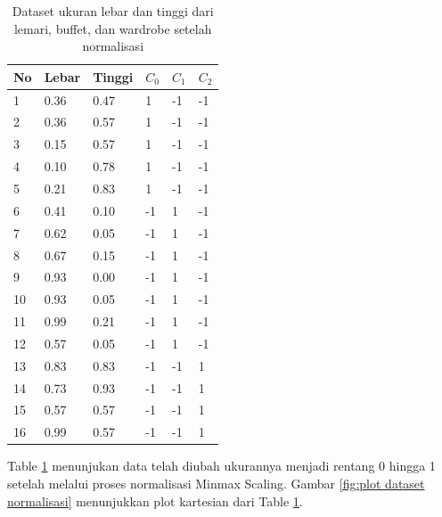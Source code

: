 \begin{table}[H]
    \centering
    \begin{tabular}{||p{1em}|p{3em}|p{3em}|p{2em}|p{2em}|p{2em}||}
    \hline
       No & Lebar & Tinggi & $C_0$ & $C_1$ & $C_2$\\ [0.5ex]
        \hline
        1 & 0.36 & 0.47 & 1 & -1 & -1\\ \hline 
        2 & 0.36 & 0.57 & 1 & -1 & -1\\ \hline	
        3 & 0.15 & 0.57 & 1 & -1 & -1\\ \hline	
        4 & 0.10 & 0.78 & 1 & -1 & -1\\ \hline	
        5 & 0.21 & 0.83 & 1 & -1 & -1\\ \hline	
        6 & 0.41 & 0.10 & -1 & 1 & -1\\ \hline	
        7 & 0.62 & 0.05 & -1 & 1 & -1\\ \hline	
        8 & 0.67 & 0.15 & -1 & 1 & -1\\ \hline	
        9 & 0.93 & 0.00 & -1 & 1 & -1\\ \hline	
        10 & 0.93 & 0.05 & -1 & 1 & -1\\ \hline	
        11 & 0.99 & 0.21 & -1 & 1 & -1\\ \hline	
        12 & 0.57 & 0.05 & -1 & 1 & -1\\ \hline
        13 & 0.83 & 0.83 & -1 & -1 & 1\\ \hline
        14 & 0.73 & 0.93 & -1 & -1 & 1\\ \hline	
        15 & 0.57 & 0.57 & -1 & -1 & 1\\ \hline	
        16 & 0.99 & 0.57 & -1 & -1 & 1\\ \hline
        \end{tabular}
    \caption{Dataset ukuran lebar dan tinggi dari lemari, buffet, dan wardrobe setelah normalisasi}
    \label{tab:Dataset normalisasi}
\end{table}

Table \ref{tab:Dataset normalisasi} menunjukan data telah diubah ukurannya menjadi rentang 0 hingga 1 setelah melalui proses normalisasi Minmax Scaling. Gambar \ref{fig:plot dataset normalisasi} menunjukkan plot kartesian dari Table \ref{tab:Dataset normalisasi}.

